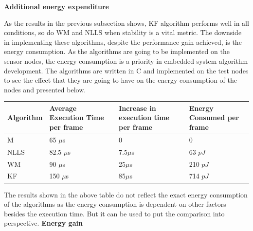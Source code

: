 \documentclass[a4paper,10pt]{report}
\begin{document}
\textbf{Additional energy expenditure}\par \noindent
As the results in the previous subsection shows, KF algorithm performs well in all conditions, so do WM and NLLS when stability is a vital metric. The downside in implementing these algorithms, despite the performance gain achieved, is the energy consumption. As the algorithms are going to be implemented on the sensor nodes, the energy consumption is a priority in embedded system algorithm development. The algorithms are written in C and implemented on the test nodes to see the effect that they are going to have on the energy consumption of the nodes and presented below.
\begin{center}
    \begin{tabular}{ |p{3cm} | p{3cm} |p{3cm} |p{3cm} | }
    \hline
    Algorithm & Average Execution Time per frame & Increase in execution time per frame & Energy Consumed per frame \\ \hline
    M &  65 $\mu$s & 0 & 0  \\ \hline
    NLLS & 82.5 $\mu$s & 7.5$\mu$s & 63 $pJ$  \\ \hline
    WM &   90 $\mu$s & 25$\mu$s & 210 $pJ$ \\ \hline
    KF &  150 $\mu$s  & 85$\mu$s &  714 $pJ$\\ \hline
    \end{tabular}
\label{tab}
\end{center}
The results shown in the above table do not reflect the exact energy consumption of the algorithms as the energy consumption is dependent on other factors besides the execution time. But it can be used to put the comparison into perspective. \newline
\textbf{Energy gain}\par \noindent
\end{document}
